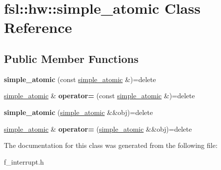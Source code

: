 \hypertarget{classfsl_1_1hw_1_1simple__atomic}{}\section{fsl\+::hw\+::simple\+\_\+atomic Class Reference}
\label{classfsl_1_1hw_1_1simple__atomic}
\subsection*{Public Member Functions}
\begin{DoxyCompactItemize}
\item 
\mbox{\label{classfsl_1_1hw_1_1simple__atomic_a7e70c308ab6cb3adf4e37ac96d3b7a9c}} 
{\bfseries simple\+\_\+atomic} (const \mbox{\hyperlink{classfsl_1_1hw_1_1simple__atomic}{simple\+\_\+atomic}} \&)=delete
\item 
\mbox{\label{classfsl_1_1hw_1_1simple__atomic_a1b5301deef713d9c1659bc7ec40f048b}} 
\mbox{\hyperlink{classfsl_1_1hw_1_1simple__atomic}{simple\+\_\+atomic}} \& {\bfseries operator=} (const \mbox{\hyperlink{classfsl_1_1hw_1_1simple__atomic}{simple\+\_\+atomic}} \&)=delete
\item 
\mbox{\label{classfsl_1_1hw_1_1simple__atomic_ac9bf9a720ac020689031b67184b1cbe6}} 
{\bfseries simple\+\_\+atomic} (\mbox{\hyperlink{classfsl_1_1hw_1_1simple__atomic}{simple\+\_\+atomic}} \&\&obj)=delete
\item 
\mbox{\label{classfsl_1_1hw_1_1simple__atomic_ac2e65461e59aae207776f1c1aa3ec8be}} 
\mbox{\hyperlink{classfsl_1_1hw_1_1simple__atomic}{simple\+\_\+atomic}} \& {\bfseries operator=} (\mbox{\hyperlink{classfsl_1_1hw_1_1simple__atomic}{simple\+\_\+atomic}} \&\&obj)=delete
\end{DoxyCompactItemize}


The documentation for this class was generated from the following file\+:\begin{DoxyCompactItemize}
\item 
f\+\_\+interrupt.\+h\end{DoxyCompactItemize}
